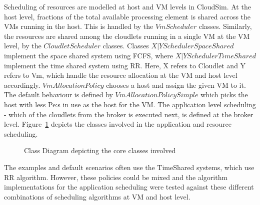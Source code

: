 \documentclass[times, 10pt,twocolumn]{article}
\begin{document}
Scheduling of resources are modelled at host and VM levels in CloudSim. At the host level, fractions of the total available processing element is shared across the VMs running in the host. This is handled by the $VmScheduler$ classes. Similarly, the resources are shared among the cloudlets running in a single VM at the VM level, by the $CloudletScheduler$ classes. Classes ${X|Y}SchedulerSpaceShared$ implement the space shared system using FCFS, where ${X|Y}SchedulerTimeShared$ implement the time shared system using RR. Here, X refers to Cloudlet and Y refers to Vm, which handle the resource allocation at the VM and host level accordingly. $VmAllocationPolicy$ chooses a host and assign the given VM to it. The default behaviour is defined by $VmAllocationPolicySimple$ which picks the host with less Pe:s in use as the host for the VM. The application level scheduling - which of the cloudlets from the broker is executed next, is defined at the broker level. Figure~\ref{fig:classdiagram} depicts the classes involved in the application and resource scheduling.
\begin{figure}[ht]
 \caption{Class Diagram depicting the core classes involved}
 \label{fig:classdiagram}
\end{figure}

The examples and default scenarios often use the TimeShared systems, which use RR algorithm. However, these policies could be mixed and the algorithm implementations for the application scheduling were tested against these different combinations of scheduling algorithms at VM and host level.
\end{document}
